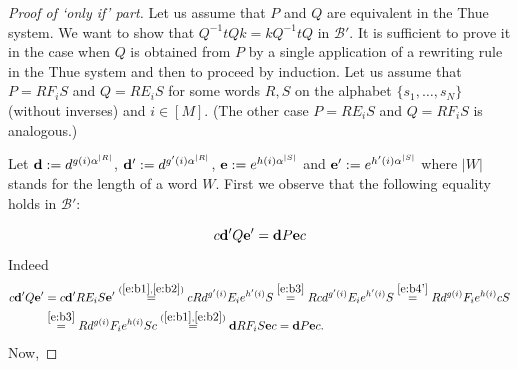 \documentclass[10pt,a4paper]{article}
\theoremstyle{definition}
\theoremstyle{remark}
\newcommand\BB{\mathcal{B}}
\newcommand\makevec[1]{{\bf #1}}
\def \dd {\makevec{d}}
\def \ee {\makevec{e}}
\begin{document}
\begin{proof}[Proof of `only if' part]
%
%
%
  
  Let us assume that $P$ and $Q$ are equivalent in the Thue system. We want to
  show that $Q^{-1}tQk = kQ^{-1}tQ$ in $\BB'$.
  It is sufficient to prove it in
  the case when $Q$ is obtained from $P$ by a single application of a rewriting
  rule in the Thue system and then to proceed by induction. Let us assume that
  $P = RF_iS$ and $Q = RE_iS$ for some words $R, S$ on the alphabet $\{s_1,
  \dots, s_N\}$ (without inverses) and $i \in [M]$. (The other case $P = RE_iS$
  and $Q = RF_iS$ is analogous.)

  Let $\dd := d^{g(i)\alpha^{|R|}}$, $\dd' := d^{g'(i)\alpha^{|R|}}$, $\ee :=
  e^{h(i)\alpha^{|S|}}$ and $\ee' := e^{h'(i)\alpha^{|S|}}$ where $|W|$ stands for
  the length of a word $W$. First we observe that the following equality holds
  in $\BB'$:

  \begin{equation}
    \label{e:dPec}
    c\dd' Q \ee' = \dd P \ee c
  \end{equation}
Indeed
 \begin{align*}
   c\dd' Q \ee' &= c\dd' RE_iS \ee' \stackrel{(\ref{e:b1},\ref{e:b2})}{=}
   cRd^{g'(i)} E_i  e^{h'(i)} S  \stackrel{\eqref{e:b3}}{=} Rcd^{g'(i)} E_i
   e^{h'(i)} S
   \stackrel{\eqref{e:b4'}}{=} Rd^{g(i)} F_i e^{h(i)} cS \\
   &\stackrel{\eqref{e:b3}}{=} Rd^{g(i)} F_i e^{h(i)} Sc 
   \stackrel{(\ref{e:b1},\ref{e:b2})}{=} \dd RF_iS \ee c = \dd P \ee c. 
 \end{align*}
Now,


\end{proof}
\end{document}
